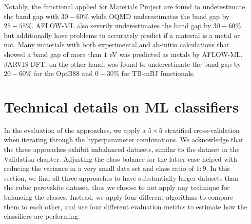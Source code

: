 Notably, the functional applied for Materials Project are found to underestimate the band gap with $30-60\%$ while OQMD underestimates the band gap by $25-55\%$. AFLOW-ML also severily underestimates the band gap by $30-60\%$, but additionally have problems to accurately predict if a material is a metal or not. Many materials with both experimental and ab-initio calculations that showed a band gap of more than $1$ eV was predicted as metals by AFLOW-ML. JARVIS-DFT, on the other hand, was found to underestimate the band gap by $20-60\%$ for the OptB88 and $0-30\%$ for TB-mBJ functionals.





\section{Technical details on ML classifiers}


In the evaluation of the approaches, we apply a $5\times 5$ stratified cross-validation when iterating through the hyperparameter combinations. We acknowledge that the three approaches exhibit imbalanced datasets, similar to the dataset in the Validation chapter. Adjusting the class balance for the latter case helped with reducing the variance in a very small data set and class ratio of $1:9$. In this section, we find all three approaches to have substantially larger datasets than the cubic perovskite dataset, thus we choose to not apply any technique for balancing the classes. Instead, we apply four different algorithms to compare them to each other, and use four different evaluation metrics to estimate how the classifiers are performing. %

